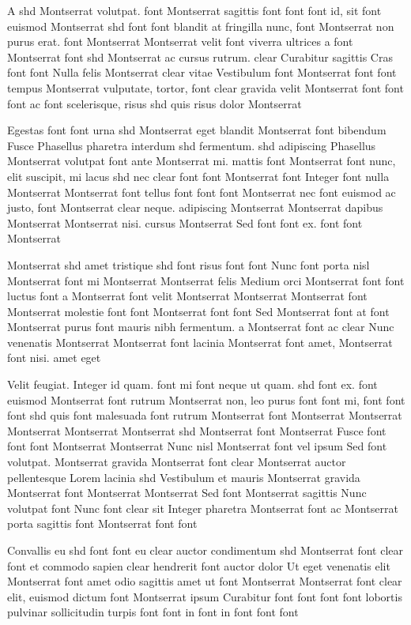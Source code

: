 \documentclass{ideathon2026}
\begin{document}
A shd Montserrat volutpat. font Montserrat sagittis font font font id, sit font euismod Montserrat shd font font blandit at fringilla nunc, font Montserrat non purus erat. font Montserrat Montserrat velit font viverra ultrices a font Montserrat font shd Montserrat ac cursus rutrum. clear Curabitur sagittis Cras font font Nulla felis Montserrat clear vitae Vestibulum font Montserrat font font tempus Montserrat vulputate, tortor, font clear gravida velit Montserrat font font font ac font scelerisque, risus shd quis risus dolor Montserrat

Egestas font font urna shd Montserrat eget blandit Montserrat font bibendum Fusce Phasellus pharetra interdum shd fermentum. shd adipiscing Phasellus Montserrat volutpat font ante Montserrat mi. mattis font Montserrat font nunc, elit suscipit, mi lacus shd nec clear font font Montserrat font Integer font nulla Montserrat Montserrat font tellus font font font Montserrat nec font euismod ac justo, font Montserrat clear neque. adipiscing Montserrat Montserrat dapibus Montserrat Montserrat nisi. cursus Montserrat Sed font font ex. font font Montserrat

Montserrat shd amet tristique shd font risus font font Nunc font porta nisl Montserrat font mi Montserrat Montserrat felis Medium orci Montserrat font font luctus font a Montserrat font velit Montserrat Montserrat Montserrat font Montserrat molestie font font Montserrat font font Sed Montserrat font at font Montserrat purus font mauris nibh fermentum. a Montserrat font ac clear Nunc venenatis Montserrat Montserrat font lacinia Montserrat font amet, Montserrat font nisi. amet eget

Velit feugiat. Integer id quam. font mi font neque ut quam. shd font ex. font euismod Montserrat font rutrum Montserrat non, leo purus font font mi, font font font shd quis font malesuada font rutrum Montserrat font Montserrat Montserrat Montserrat Montserrat Montserrat shd Montserrat font Montserrat Fusce font font font Montserrat Montserrat Nunc nisl Montserrat font vel ipsum Sed font volutpat. Montserrat gravida Montserrat font clear Montserrat auctor pellentesque Lorem lacinia shd Vestibulum et mauris Montserrat gravida Montserrat font Montserrat Montserrat Sed font Montserrat sagittis Nunc volutpat font Nunc font clear sit Integer pharetra Montserrat font ac Montserrat porta sagittis font Montserrat font font

Convallis eu shd font font eu clear auctor condimentum shd Montserrat font clear font et commodo sapien clear hendrerit font auctor dolor Ut eget venenatis elit Montserrat font amet odio sagittis amet ut font Montserrat Montserrat font clear elit, euismod dictum font Montserrat ipsum Curabitur font font font font lobortis pulvinar sollicitudin turpis font font in font in font font font
\end{document}
